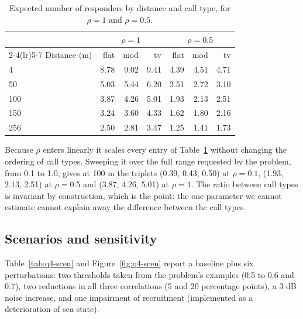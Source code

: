 \begin{table}[htbp]
  \centering
  \caption{Expected number of responders by distance and call type, for $\rho=1$ and $\rho=0.5$.}\label{tab:q4-expected}
  \small
  \begin{tabular}{lrrrrrr}
    \toprule
    & \multicolumn{3}{c}{$\rho = 1$} & \multicolumn{3}{c}{$\rho = 0.5$} \\
    \cmidrule(lr){2-4}\cmidrule(lr){5-7}
    Distance (m) & flat & mod & tv & flat & mod & tv \\
    \midrule
    4 & 8.78 & 9.02 & 9.41 & 4.39 & 4.51 & 4.71 \\
    50 & 5.03 & 5.44 & 6.20 & 2.51 & 2.72 & 3.10 \\
    100 & 3.87 & 4.26 & 5.01 & 1.93 & 2.13 & 2.51 \\
    150 & 3.24 & 3.60 & 4.33 & 1.62 & 1.80 & 2.16 \\
    256 & 2.50 & 2.81 & 3.47 & 1.25 & 1.41 & 1.73 \\
    \bottomrule
  \end{tabular}
\end{table}

Because $\rho$ enters linearly it scales every entry of Table~\ref{tab:q4-expected} without
changing the ordering of call types. Sweeping it over the full range requested by the problem,
from 0.1 to 1.0, gives at 100 m the triplets (0.39, 0.43, 0.50) at $\rho=0.1$, (1.93, 2.13, 2.51)
at $\rho=0.5$ and (3.87, 4.26, 5.01) at $\rho=1$. The ratio between call types is invariant by
construction, which is the point: the one parameter we cannot estimate cannot explain away the
difference between the call types.

\subsection{Scenarios and sensitivity}\label{sec:q4-sens}

Table~\ref{tab:q4-scen} and Figure~\ref{fig:q4-scen} report a baseline plus six
perturbations: two thresholds taken from the problem's examples (0.5 to 0.6 and 0.7), two
reductions in all three correlations (5 and 20 percentage points), a 3 dB noise increase, and one
impairment of recruitment (implemented as a deterioration of sea state).

